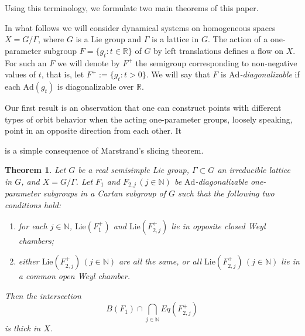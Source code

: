 \documentclass[reqno,12pt]{amsart}
\newtheorem{theorem}{Theorem}[section]
\theoremstyle{definition}
\numberwithin{equation}{section}
\newcommand{\RR}{\mathbb{R}}
\newcommand{\NN}{\mathbb{N}}
\newcommand{\Ad}{\mathrm{Ad}}
\newcommand{\Lie}{\mathrm{Lie}}
\newcommand {\new}[1]   {\textcolor{blue}{#1}}
\newcommand {\comm}[1]   {\textcolor{red}{#1}}
\begin{document}
Using this terminology, we formulate two main theorems of this paper.
{In what follows we will consider dynamical systems on homogeneous spaces $X=G/\Gamma$, where {$G$ is a  Lie group and $\Gamma$ is a lattice in $G$. The  action of a one-parameter subgroup $F=\{g_t:t \in \RR\}$  of $G$ by left translations defines a flow on $X$. For such an $F$ we will denote by $F^+$ the semigroup corresponding to non-negative values of $t$, that is, let $F^+:= \{g_t:t >0\}$. We will say  that $F$ is \textit{$\Ad$-diagonalizable} if each $\Ad(g_t)$ is diagonalizable over $\RR$.}

Our first result
is  an observation that one can construct points with different types of orbit behavior when the acting one-parameter groups, loosely speaking, point in an opposite direction from each other. It} 
is a simple consequence of Marstrand's slicing theorem.

\begin{theorem}\label{MainThm00}
    Let $G$ be a real semisimple Lie group,  $\Gamma\subset G$   an irreducible lattice in $G$, and $X=G/\Gamma$. Let $F_1$ and $F_{2,j}\,(j\in\NN)$ be %
    $\Ad$-diagonalizable one-parameter subgroups in a Cartan subgroup of $G$ such that the following two conditions hold:
    \begin{enumerate}
        \item[\rm (1)] for each $j\in\NN$, $\mathrm{Lie}(F_1^+)$ and $\mathrm{Lie}(F_{2,j}^+)$ lie in opposite closed Weyl chambers; 
        \item[\rm (2)] either $\Lie(F_{2,j}^+)\,(j\in\NN)$ are all the same, or all $\Lie(F_{2,j}^+)\,(j\in\NN)$ lie in a common open Weyl chamber.
    \end{enumerate}
    Then the intersection $$
    B(F_1)\cap \bigcap_{j\in\NN}Eq(F_{2,j}^+)
    $$ is thick in $X$.
\end{theorem}

\end{document}
